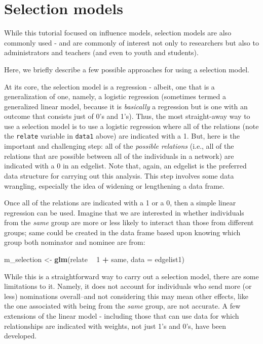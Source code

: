 \documentclass[]{book}
\newenvironment{Shaded}{\begin{snugshade}}{\end{snugshade}}
\newcommand{\KeywordTok}[1]{\textcolor[rgb]{0.13,0.29,0.53}{\textbf{#1}}}
\newcommand{\DataTypeTok}[1]{\textcolor[rgb]{0.13,0.29,0.53}{#1}}
\newcommand{\DecValTok}[1]{\textcolor[rgb]{0.00,0.00,0.81}{#1}}
\newcommand{\StringTok}[1]{\textcolor[rgb]{0.31,0.60,0.02}{#1}}
\newcommand{\OperatorTok}[1]{\textcolor[rgb]{0.81,0.36,0.00}{\textbf{#1}}}
\newcommand{\NormalTok}[1]{#1}
\begin{document}
\section{Selection models}\label{selection-models}

While this tutorial focused on influence models, selection models are
also commonly used - and are commonly of interest not only to
researchers but also to administrators and teachers (and even to youth
and students).

Here, we briefly describe a few possible approaches for using a
selection model.

At its core, the selection model is a regression - albeit, one that is a
generalization of one, namely, a logistic regression (sometimes termed a
generalized linear model, because it is \emph{basically} a regression
but is one with an outcome that consists just of 0's and 1's). Thus, the
most straight-away way to use a selection model is to use a logistic
regression where all of the relations (note the \texttt{relate} variable
in \texttt{data1} above) are indicated with a 1. But, here is the
important and challenging step: all of the \emph{possible relations}
(i.e., all of the relations that are possible between all of the
individuals in a network) are indicated with a 0 in an edgelist. Note
that, again, an edgelist is the preferred data structure for carrying
out this analysis. This step involves some data wrangling, especially
the idea of widening or lengthening a data frame.

Once all of the relations are indicated with a 1 or a 0, then a simple
linear regression can be used. Imagine that we are interested in whether
individuals from the \emph{same} group are more or less likely to
interact than those from different groups; same could be created in the
data frame based upon knowing which group both nominator and nominee are
from:

\begin{Shaded}
\begin{Highlighting}[]
\NormalTok{m_selection <-}\StringTok{ }\KeywordTok{glm}\NormalTok{(relate }\OperatorTok{~}\StringTok{ }\DecValTok{1} \OperatorTok{+}\StringTok{ }\NormalTok{same, }\DataTypeTok{data =}\NormalTok{ edgelist1)}
\end{Highlighting}
\end{Shaded}

While this is a straightforward way to carry out a selection model,
there are some limitations to it. Namely, it does not account for
individuals who send more (or less) nominations overall--and not
considering this may mean other effects, like the one associated with
being from the \emph{same} group, are not accurate. A few extensions of
the linear model - including those that can use data for which
relationships are indicated with weights, not just 1's and 0's, have
been developed.
\end{document}
